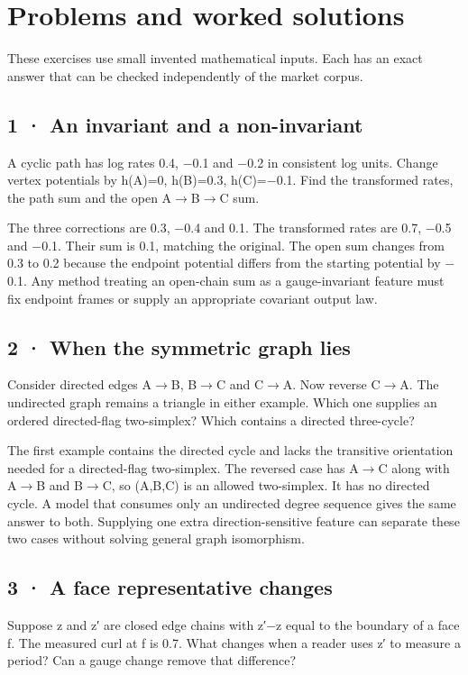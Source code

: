 \documentclass[11pt,oneside,openany]{book}
\begin{document}
\chapter{Problems and worked solutions}
These exercises use small invented mathematical inputs. Each has an exact answer that can be checked independently of the market corpus.

\section*{1 · An invariant and a non-invariant}
A cyclic path has log rates 0.4, \ensuremath{-}0.1 and \ensuremath{-}0.2 in consistent log units. Change vertex potentials by h(A)=0, h(B)=0.3, h(C)=\ensuremath{-}0.1. Find the transformed rates, the path sum and the open A\ensuremath{\to}B\ensuremath{\to}C sum.

The three corrections are 0.3, \ensuremath{-}0.4 and 0.1. The transformed rates are 0.7, \ensuremath{-}0.5 and \ensuremath{-}0.1. Their sum is 0.1, matching the original. The open sum changes from 0.3 to 0.2 because the endpoint potential differs from the starting potential by \ensuremath{-}0.1. Any method treating an open-chain sum as a gauge-invariant feature must fix endpoint frames or supply an appropriate covariant output law.

\section*{2 · When the symmetric graph lies}
Consider directed edges A\ensuremath{\to}B, B\ensuremath{\to}C and C\ensuremath{\to}A. Now reverse C\ensuremath{\to}A. The undirected graph remains a triangle in either example. Which one supplies an ordered directed-flag two-simplex? Which contains a directed three-cycle?

The first example contains the directed cycle and lacks the transitive orientation needed for a directed-flag two-simplex. The reversed case has A\ensuremath{\to}C along with A\ensuremath{\to}B and B\ensuremath{\to}C, so (A,B,C) is an allowed two-simplex. It has no directed cycle. A model that consumes only an undirected degree sequence gives the same answer to both. Supplying one extra direction-sensitive feature can separate these two cases without solving general graph isomorphism.

\section*{3 · A face representative changes}
Suppose z and z′ are closed edge chains with z′\ensuremath{-}z equal to the boundary of a face f. The measured curl at f is 0.7. What changes when a reader uses z′ to measure a period? Can a gauge change remove that difference?
\end{document}
